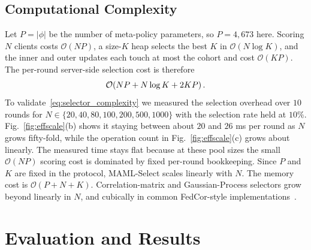\documentclass[journal]{IEEEtran}
\theoremstyle{remark}
\newcommand{\revision}[1]{#1}
\begin{document}
\subsection{Computational Complexity}
\revision{Let $P=|\phi|$ be the number of meta-policy parameters, so $P=4{,}673$ here. Scoring $N$ clients costs $\mathcal{O}(NP)$, a size-$K$ heap selects the best $K$ in $\mathcal{O}(N\log K)$, and the inner and outer updates each touch at most the cohort and cost $\mathcal{O}(KP)$. The per-round server-side selection cost is therefore}
\begin{equation}
	\color{black}
	\mathcal{O}\!\left(NP + N\log K + 2KP\right).
	\label{eq:selector_complexity}
\end{equation}
\revision{To validate~\eqref{eq:selector_complexity} we measured the selection overhead over $10$ rounds for $N\in\{20,40,80,100,200,500,1000\}$ with the selection rate held at $10\%$. Fig.~\ref{fig:effscale}(b) shows it staying between about $20$ and $26$ ms per round as $N$ grows fifty-fold, while the operation count in Fig.~\ref{fig:effscale}(c) grows about linearly. The measured time stays flat because at these pool sizes the small $\mathcal{O}(NP)$ scoring cost is dominated by fixed per-round bookkeeping. Since $P$ and $K$ are fixed in the protocol, MAML-Select scales linearly with $N$. The memory cost is $\mathcal{O}(P+N+K)$. Correlation-matrix and Gaussian-Process selectors grow beyond linearly in $N$, and cubically in common FedCor-style implementations~\cite{tang2022fedcor}.}

\section{Evaluation and Results}
\end{document}
